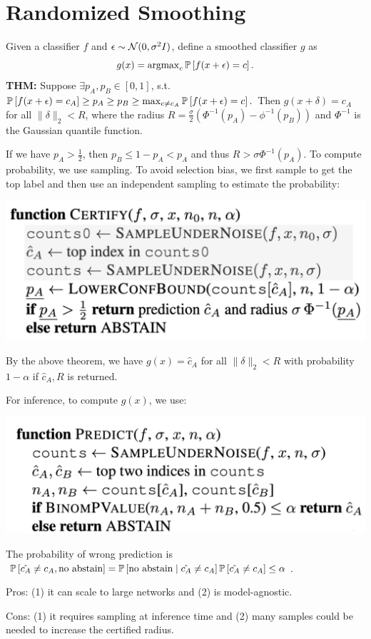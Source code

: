 \section{Randomized Smoothing}

Given a classifier $f$ and $\epsilon \sim \No(0,\sigma^2 I)$, define a smoothed classifier $g$ as
$$g(x)=\argmax_c \P\left[f(x+\epsilon)=c\right].$$
\textbf{THM:} Suppose $\exists {p_A}, {p_B} \in [0,1]$, s.t. $\P\left[f(x+\epsilon)=c_A\right] \ge {p_A} \ge {p_B} \ge \max_{c\ne c_A} \P\left[f(x+\epsilon)=c\right].$ Then $g(x+\delta)=c_A$ for all $\|\delta\|_2 <R$, where the radius $R=\frac{\sigma}{2} (\Phi^{-1}({p_A})-\phi^{-1}({p_B}))$ and $\Phi^{-1}$ is the Gaussian quantile function.

If we have ${p_A}>\frac{1}{2}$, then ${p_B}\leq1-{p_A}<p_A$ and thus $R>\sigma \Phi^{-1}({p_A})$. To compute probability, we use sampling. To avoid selection bias, we first sample to get the top label and then use an independent sampling to estimate the probability:

\includegraphics[width=\columnwidth]{img/rand_smooth.png}

By the above theorem, we have $g(x)=\hat{c}_A$ for all $\|\delta\|_2 <R$
with probability $1-\alpha$ if $\hat{c}_A, R$ is returned.

For inference, to compute $g(x)$, we use:

\includegraphics[width=\columnwidth]{img/rand-predict.png}

The probability of wrong prediction is $\P\left[\hat{c_A}\ne c_A, \text{no abstain}\right] = \P\left[\text{no abstain} \mid \hat{c_A}\ne c_A\right] \P\left[\hat{c_A}\ne c_A\right]\le \alpha$.

Pros: (1) it can scale to large networks and (2) is model-agnostic.

Cons: (1) it requires sampling at inference time and (2) many samples could be needed to increase the certified radius.